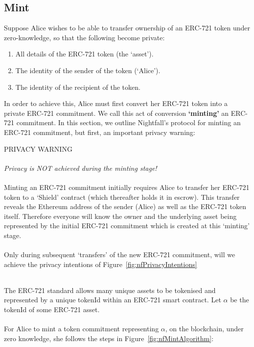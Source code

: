 \subsection{Mint}
\label{sec:721Mint}

Suppose Alice wishes to be able to transfer ownership of an ERC-721 token under zero-knowledge, so that the following become private:

\begin{center}
  \begin{framed}
    \begin{enumerate}
      \item All details of the ERC-721 token (the `asset').
      \item The identity of the sender of the token (`Alice').
      \item The identity of the recipient of the token.
    \end{enumerate}
  \end{framed}
\end{center}

In order to achieve this, Alice must first convert her ERC-721 token into a private ERC-721 commitment. We call this act of conversion \textbf{`minting'} an ERC-721 commitment.
In this section, we outline Nightfall's protocol for minting an ERC-721 commitment, but first, an important privacy warning:

\begin{center}
  \begin{mdframed}[backgroundcolor=verylightred]
    \noindent
    PRIVACY WARNING\\
    \\
    \textit{
    Privacy is NOT achieved during the minting stage!
    }\\
    \\
    Minting an ERC-721 commitment initially requires Alice to transfer her ERC-721 token to a `Shield' contract (which thereafter holds it in escrow). This transfer reveals the Ethereum address of the sender (Alice) as well as the ERC-721 token itself. Therefore everyone will know the owner and the underlying asset being represented by the initial ERC-721 commitment which is created at this `minting' stage.\\
    \\
    Only during subsequent `transfers' of the new ERC-721 commitment, will we achieve the privacy intentions of Figure~\ref{fig:nfPrivacyIntentions}
  \end{mdframed}
\end{center}
\ \\
The ERC-721 standard allows many unique assets to be tokenised and represented by a unique tokenId within an ERC-721 smart contract.
Let $\alpha$ be the tokenId of some ERC-721 asset.\\
\\
For Alice to mint a token commitment representing $\alpha$, on the blockchain, under zero knowledge, she follows the steps in Figure~\ref{fig:nfMintAlgorithm}:

